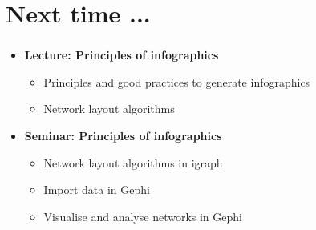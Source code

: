 \documentclass[8pt]{beamer}
\begin{document}
\section*{Next time ...}

\bgroup
{}
\begin{frame}[plain]{}
\begin{center}
\color{white}{\Huge\insertsection}
\end{center}
\end{frame}
\egroup


\begin{frame}
\frametitle{\insertsection}

\begin{itemize}

\item 	\textbf{Lecture: Principles of infographics}
	\begin{itemize}
	\item Principles and good practices to generate infographics
	\item Network layout algorithms
	\end{itemize}


\medskip
\medskip


\item 	\textbf{Seminar: Principles of infographics}
	\begin{itemize}
	\item Network layout algorithms in igraph
	\item Import data in Gephi
	\item Visualise and analyse networks in Gephi
	\end{itemize}
	
\end{itemize}

\end{frame}

\end{document}

